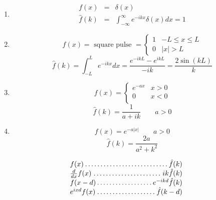 \documentclass[german, 10pt, a4paper, twocolumn]{scrartcl}
\begin{document}
\begin{enumerate}
	\item 	\begin{eqnarray}
			f(x) &		= &		\delta(x) \nonumber \nonumber \\
			\hat{f}(k) &	= &		\int^{\infty}_{-\infty} e^{-ikx}\delta(x) dx = 1 \nonumber
		\end{eqnarray}
	
	\item	\begin{displaymath}
			f(x) = \mbox{ square pulse } = \left
				\{
				\begin{array}{ll}
					1 &		-L \leq x \leq L\\
					0 &		|x| > L
				\end{array}
				\right .
		\end{displaymath}
		\begin{displaymath}
			\hat{f}(k)=\int^{L}_{-L}e^{-ikx}dx = \frac{e^{-ikL}-e^{ikL}}{-ik}=\frac{2\sin(kL)}{k}
		\end{displaymath}
	
	\item	\begin{displaymath}
			f(x) = \left
				\{
				\begin{array}{ll}
					e^{-ax} &		x > 0\\
					0 &			x < 0\\
				\end{array}
				\right .
		\end{displaymath}
		\begin{displaymath}
			\hat{f}(k)=\frac{1}{a+ik} \qquad a> 0
		\end{displaymath}
	
	\item	\begin{displaymath}
			f(x) = e^{-a|x|} \qquad a > 0
		\end{displaymath}
		\begin{displaymath}
			\hat{f}(k)= \frac{2a}{a^2+k^2}
		\end{displaymath}
\end{enumerate}

\begin{displaymath}
	\begin{array}{l}
		f(x) \dotfill \hat{f}(k) \\
		\frac{d}{dx} f(x) \dotfill ik\hat{f}(k)\\
		f(x-d) \dotfill	e^{-ikd}\hat{f}(k) \\
		e^{ixd}f(x) \dotfill \hat{f}(k-d)\\
		\qquad\qquad\qquad\qquad\qquad\qquad\qquad\qquad
	\end{array}
\end{displaymath}
\end{document}
